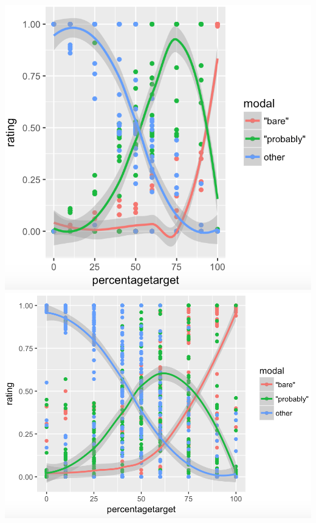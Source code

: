 \documentclass{sp}          %
\begin{document}
\begin{center}
\includegraphics[scale=0.45]{Condition-0-batch1-trials.png}
\includegraphics[scale=0.4]{Condition-1-trials.png}

\end{center}
\end{document}
